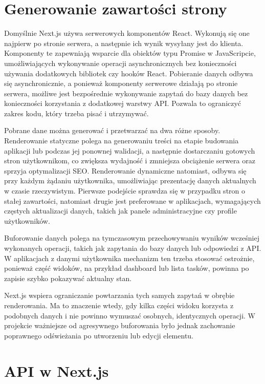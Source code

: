 \documentclass[12pt,a4paper,twoside]{report}
\newcommand{\FirstParagraph}{\noindent\ignorespaces}
\begin{document}
\section{Generowanie zawartości strony}

\FirstParagraph Domyślnie Next.js używa serwerowych komponentów React. Wykonują się one najpierw po stronie serwera, a następnie ich wynik wysyłany jest do klienta. Komponenty te zapewniają wsparcie dla obiektów typu Promise w JavaScripcie, umożliwiających wykonywanie operacji asynchronicznych bez konieczności używania dodatkowych bibliotek czy hooków React. Pobieranie danych odbywa się asynchronicznie, a ponieważ komponenty serwerowe działają po stronie serwera, możliwe jest bezpośrednie wykonywanie zapytań do bazy danych bez konieczności korzystania z dodatkowej warstwy API. Pozwala to ograniczyć zakres kodu, który trzeba pisać i utrzymywać.

Pobrane dane można generować i przetwarzać na dwa różne sposoby. Renderowanie statyczne polega na generowaniu treści na etapie budowania aplikacji lub podczas jej ponownej walidacji, a następnie dostarczaniu gotowych stron użytkownikom, co zwiększa wydajność i zmniejsza obciążenie serwera oraz sprzyja optymalizacji SEO. Renderowanie dynamiczne natomiast, odbywa się przy każdym żądaniu użytkownika, umożliwiając prezentację danych aktualnych w czasie rzeczywistym. Pierwsze podejście sprawdza się w przypadku stron o stałej zawartości, natomiast drugie jest preferowane w aplikacjach, wymagających częstych aktualizacji danych, takich jak panele administracyjne czy profile użytkowników.

Buforowanie danych polega na tymczasowym przechowywaniu wyników wcześniej wykonanych operacji, takich jak zapytania do bazy danych lub odpowiedzi z API. W aplikacjach z danymi użytkownika mechanizm ten trzeba stosować ostrożnie, ponieważ część widoków, na przykład dashboard lub lista tasków, powinna po zapisie szybko pokazywać aktualny stan.

Next.js wspiera ograniczanie powtarzania tych samych zapytań w obrębie renderowania. Ma to znaczenie wtedy, gdy kilka części widoku korzysta z podobnych danych i nie powinno wymuszać osobnych, identycznych operacji. W projekcie ważniejsze od agresywnego buforowania było jednak zachowanie poprawnego odświeżania po utworzeniu lub edycji elementu.

\section{API w Next.js}
\end{document}
